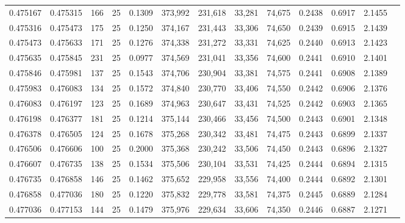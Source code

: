 \begin{tabular}{rrrrrrrrrrrrr}
0.475167 & 0.475315 &   166 &  25 &                                     0.1309 & 373,992 & 231,618 &  33,281 &  74,675 & 0.2438 & 0.6917 & 2.1455 \\
0.475316 & 0.475473 &   175 &  25 &                                     0.1250 & 374,167 & 231,443 &  33,306 &  74,650 & 0.2439 & 0.6915 & 2.1439 \\
0.475473 & 0.475633 &   171 &  25 &                                     0.1276 & 374,338 & 231,272 &  33,331 &  74,625 & 0.2440 & 0.6913 & 2.1423 \\
0.475635 & 0.475845 &   231 &  25 &                                     0.0977 & 374,569 & 231,041 &  33,356 &  74,600 & 0.2441 & 0.6910 & 2.1401 \\
0.475846 & 0.475981 &   137 &  25 &                                     0.1543 & 374,706 & 230,904 &  33,381 &  74,575 & 0.2441 & 0.6908 & 2.1389 \\
0.475983 & 0.476083 &   134 &  25 &                                     0.1572 & 374,840 & 230,770 &  33,406 &  74,550 & 0.2442 & 0.6906 & 2.1376 \\
0.476083 & 0.476197 &   123 &  25 &                                     0.1689 & 374,963 & 230,647 &  33,431 &  74,525 & 0.2442 & 0.6903 & 2.1365 \\
0.476198 & 0.476377 &   181 &  25 &                                     0.1214 & 375,144 & 230,466 &  33,456 &  74,500 & 0.2443 & 0.6901 & 2.1348 \\
0.476378 & 0.476505 &   124 &  25 &                                     0.1678 & 375,268 & 230,342 &  33,481 &  74,475 & 0.2443 & 0.6899 & 2.1337 \\
0.476506 & 0.476606 &   100 &  25 &                                     0.2000 & 375,368 & 230,242 &  33,506 &  74,450 & 0.2443 & 0.6896 & 2.1327 \\
0.476607 & 0.476735 &   138 &  25 &                                     0.1534 & 375,506 & 230,104 &  33,531 &  74,425 & 0.2444 & 0.6894 & 2.1315 \\
0.476735 & 0.476858 &   146 &  25 &                                     0.1462 & 375,652 & 229,958 &  33,556 &  74,400 & 0.2444 & 0.6892 & 2.1301 \\
0.476858 & 0.477036 &   180 &  25 &                                     0.1220 & 375,832 & 229,778 &  33,581 &  74,375 & 0.2445 & 0.6889 & 2.1284 \\
0.477036 & 0.477153 &   144 &  25 &                                     0.1479 & 375,976 & 229,634 &  33,606 &  74,350 & 0.2446 & 0.6887 & 2.1271 \\

\end{tabular}
